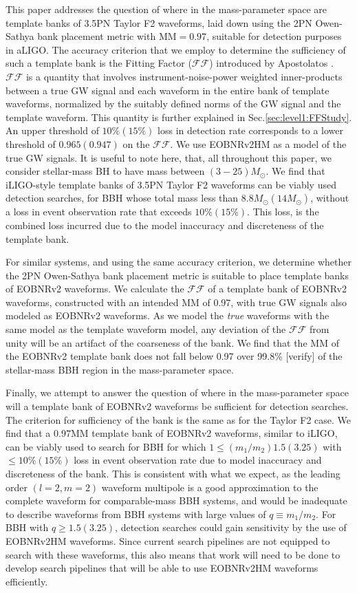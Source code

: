 \documentclass[aps,
prd,
amsmath,
amssymb,
twocolumn,
floatfix,
groupedaddress]{revtex4-1}
\newcommand{\FF}{\mathcal{FF}}
\newcommand{\MM}{\mathrm{MM}}
\def\l({\left(}
\def\r){\right)}
\begin{document}
This paper addresses the question of where in the mass-parameter space are template banks of 3.5PN Taylor F2 waveforms, laid down using the 2PN Owen-Sathya bank placement metric with $\MM = 0.97$, suitable for detection purposes in aLIGO. The accuracy criterion that we employ to determine the sufficiency of such a template bank is the Fitting Factor ($\FF$) introduced by Apostolatos \citep{FittingFactorApostolatos}. $\FF$ is a quantity that involves instrument-noise-power weighted inner-products between a true GW signal and each waveform in the entire bank of template waveforms, normalized by the suitably defined norms of the GW signal and the template waveform. This quantity is further explained in Sec.\ref{sec:level1:FFStudy}. An upper threshold of $10\% (15\%)$ loss in detection rate corresponds to a lower threshold of $0.965 (0.947)$ on the $\FF$. We use EOBNRv2HM as a model of the true GW signals. It is useful to note here, that, all throughout this paper, we consider stellar-mass BH to have mass between $(3-25)M_{\odot}$. We find that iLIGO-style template banks of 3.5PN Taylor F2 waveforms can be viably used detection searches, for BBH whose total mass less than $8.8M_{\odot} (14M_{\odot})$, without a loss in event observation rate that exceeds $10\% (15\%)$. This loss, is the combined loss incurred due to the model inaccuracy and discreteness of the template bank. 

For similar systems, and using the same accuracy criterion, we determine whether the 2PN Owen-Sathya bank placement metric is suitable to place template banks of EOBNRv2 waveforms. We calculate the $\FF$ of a template bank of EOBNRv2 waveforms, constructed with an intended $\MM$ of 0.97, with true GW signals also modeled as EOBNRv2 waveforms. As we model the \textit{true} waveforms with the same model as the template waveform model, any deviation of the $\FF$ from unity will be an artifact of the coarseness of the bank. We find that the $\MM$ of the EOBNRv2 template bank does not fall below 0.97 over 99.8\% [verify] of the stellar-mass BBH region in the mass-parameter space.

Finally, we attempt to answer the question of where in the mass-parameter space will a template bank of EOBNRv2 waveforms be sufficient for detection searches. The criterion for sufficiency of the bank is the same as for the Taylor F2 case. We find that a $0.97\MM$ template bank of EOBNRv2 waveforms, similar to iLIGO, can be viably used to search for BBH for which $1\leq \l(m_1/m_2\r) 1.5 (3.25)$ with $\leq 10\% (15\%)$ loss in event observation rate due to model inaccuracy and discreteness of the bank. This is consistent with what we expect, as the leading order $(l=2,m=2)$ waveform multipole is a good approximation to the complete waveform for comparable-mass BBH systems, and would be inadequate to describe waveforms from BBH systems with large values of $q\equiv m_1/m_2$. For BBH with $q\geq 1.5 (3.25)$, detection searches could gain sensitivity by the use of EOBNRv2HM waveforms. Since current search pipelines are not equipped to search with these waveforms, this also means that work will need to be done to develop search pipelines that will be able to use EOBNRv2HM waveforms efficiently.
\end{document}
